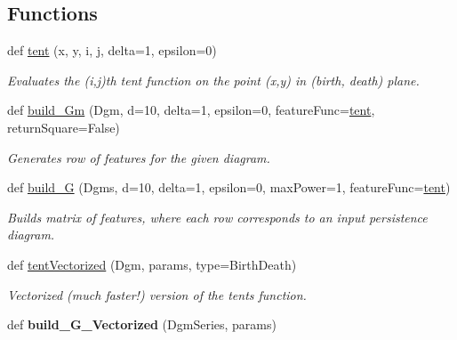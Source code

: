 \subsection*{Functions}
\begin{DoxyCompactItemize}
\item 
def \hyperlink{namespaceteaspoon_1_1_m_l_1_1tents_a7e54522bba1f674736551ec0522828fa}{tent} (x, y, i, j, delta=1, epsilon=0)
\begin{DoxyCompactList}\small\item\em Evaluates the (i,j)th tent function on the point (x,y) in (birth, death) plane. \end{DoxyCompactList}\item 
def \hyperlink{namespaceteaspoon_1_1_m_l_1_1tents_ac230b402d60eb765d2c2776027afaaa9}{build\+\_\+\+Gm} (Dgm, d=10, delta=1, epsilon=0, feature\+Func=\hyperlink{namespaceteaspoon_1_1_m_l_1_1tents_a7e54522bba1f674736551ec0522828fa}{tent}, return\+Square=False)
\begin{DoxyCompactList}\small\item\em Generates row of features for the given diagram. \end{DoxyCompactList}\item 
def \hyperlink{namespaceteaspoon_1_1_m_l_1_1tents_a19cc99365f3d375bf1ea7535095c15e3}{build\+\_\+G} (Dgms, d=10, delta=1, epsilon=0, max\+Power=1, feature\+Func=\hyperlink{namespaceteaspoon_1_1_m_l_1_1tents_a7e54522bba1f674736551ec0522828fa}{tent})
\begin{DoxyCompactList}\small\item\em Builds matrix of features, where each row corresponds to an input persistence diagram. \end{DoxyCompactList}\item 
def \hyperlink{namespaceteaspoon_1_1_m_l_1_1tents_a357bed34ad116c89be89e13f85a70c18}{tent\+Vectorized} (Dgm, params, type=\textquotesingle{}Birth\+Death\textquotesingle{})
\begin{DoxyCompactList}\small\item\em Vectorized (much faster!) version of the tents function. \end{DoxyCompactList}\item 
def {\bfseries build\+\_\+\+G\+\_\+\+Vectorized} (Dgm\+Series, params)\hypertarget{namespaceteaspoon_1_1_m_l_1_1tents_aa83ae69092ee206c41154b5d36f7969b}{}\label{namespaceteaspoon_1_1_m_l_1_1tents_aa83ae69092ee206c41154b5d36f7969b}


\end{DoxyCompactItemize}
